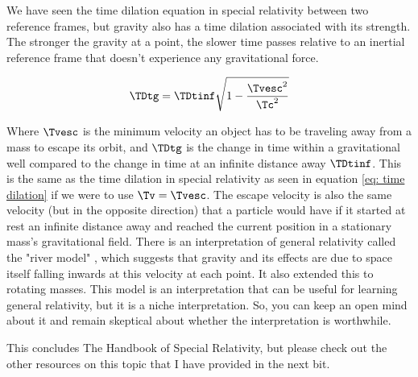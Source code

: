 We have seen the time dilation equation in special relativity between two reference frames, but gravity also has a time dilation associated with its strength.
The stronger the gravity at a point, the slower time passes relative to an inertial reference frame that doesn't experience any gravitational force.

\begin{equation}
     \TDtg = \TDtinf \sqrt{1 - \frac{\Tvesc^2}{\Tc^2}}
\end{equation}

Where $\Tvesc$ is the minimum velocity an object has to be traveling away from a mass to escape its orbit, and $\TDtg$ is the change in time within a gravitational well compared to the change in time at an infinite distance away $\TDtinf$.
This is the same as the time dilation in special relativity as seen in equation \eqref{eq: time dilation} if we were to use $\Tv=\Tvesc$.
The escape velocity is also the same velocity (but in the opposite direction) that a particle would have if it started at rest an infinite distance away and reached the current position in a stationary mass's gravitational field.
There is an interpretation of general relativity called the "river model" \cite{rivermodel}, which suggests that gravity and its effects are due to space itself falling inwards at this velocity at each point.
It also extended this to rotating masses.
This model is an interpretation that can be useful for learning general relativity, but it is a niche interpretation.
So, you can keep an open mind about it and remain skeptical about whether the interpretation is worthwhile.

This concludes The Handbook of Special Relativity, but please check out the other resources on this topic that I have provided in the next bit.




